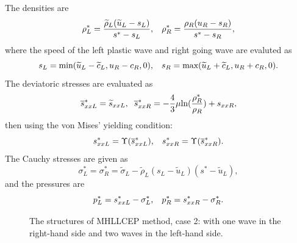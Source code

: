 \documentclass{article}
\numberwithin{equation}{section}
\numberwithin{table}{section}
\begin{document}
The densities are
\begin{equation}
  \rho_L^* = \frac{\widetilde{\rho}_L(\widetilde{u}_L-s_L)}{s^*-s_L}, \hspace{0.3cm}  \rho_R^* = \frac{\rho_R(u_R-s_R)}{s^*-s_R},
\end{equation}
where  the speed of the  left  plastic wave and right going wave are evaluted as
	\begin{equation}
	  s_L = \text{min} (\widetilde{u}_L-\widetilde{c}_L, u_R-c_R, 0), \hspace{0.3cm} s_R = \text{max}(\widetilde{u}_L+\widetilde{c}_L, u_R+c_R, 0).
	\end{equation}
The deviatoric stresses are evaluated as
\begin{equation}
  \overline{s}_{xxL}^*= \widetilde{s}_{xxL},\hspace{0.2cm}  \overline{s}_{xxR}^*=-\frac{4}{3}\mu\text{ln}(\frac{\rho_R^*}{\rho_R})+s_{xxR},
\end{equation}
then using  the von Mises' yielding condition:
\begin{equation}
  s_{xxL}^* = \Upsilon(\overline{s}_{xxL}^*), \hspace{0.3cm}  s_{xxR}^* = \Upsilon(\overline{s}_{xxR}^*).
\end{equation}
The Cauchy stresses are given as
\begin{equation}
  \sigma_L^*=\sigma_R^*=\widetilde{\sigma}_L -\widetilde{\rho}_L (s_L-\widetilde{u}_L)(s^*-\widetilde{u}_L),
\end{equation}
and the pressures are
\begin{equation}
  p_L^* = s_{xxL}^* - \sigma_L^*, \hspace{0.3cm}   p_R^* = s_{xxR}^* - \sigma_R^*.
\end{equation}

 \begin{figure}
   \centering
{}
\caption{The  structures of MHLLCEP method, case 2: with  one wave in the right-hand side and  two waves in the left-hand side.}
\label{fig:case2}
\end{figure}
\end{document}
